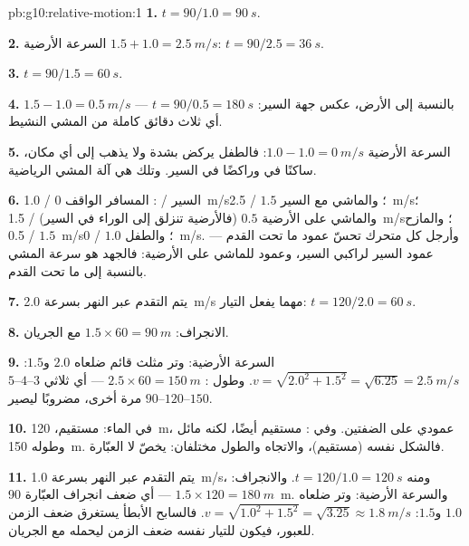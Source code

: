\begin{solution}{pb:g10:relative-motion:1}
\textbf{1.} $t = 90/1.0 = \qty{90}{s}$.

\textbf{2.} السرعة الأرضية $1.5 + 1.0 = \qty{2.5}{m/s}$:
$t = 90/2.5 = \qty{36}{s}$.

\textbf{3.} $t = 90/1.5 = \qty{60}{s}$.

\textbf{4.} $1.5 - 1.0 = \qty{0.5}{m/s}$ بالنسبة إلى الأرض،
عكس جهة السير: $t = 90/0.5 = \qty{180}{s}$ --- أي ثلاث
دقائق كاملة من المشي النشيط.

\textbf{5.} السرعة الأرضية $1.0 - 1.0 = \qty{0}{m/s}$: فالطفل يركض
بشدة ولا يذهب إلى أي مكان، ساكنًا في  وراكضًا في
 السير. وتلك هي آلة المشي الرياضية.

\textbf{6.}  السير / : المسافر الواقف $0$ /
\qty{1.0}{m/s}؛ والماشي مع السير $1.5$ / \qty{2.5}{m/s}؛ والماشي على
الأرضية $0.5$ (فالأرضية تنزلق إلى الوراء في  السير) /
\qty{1.5}{m/s}؛ والمازح $1.5$ / \qty{0.5}{m/s}؛ والطفل $1.0$ /
\qty{0}{m/s}. وأرجل كل متحرك تحسّ عمود  ما
تحت القدم --- عمود  السير لراكبي السير، وعمود
 للماشي على الأرضية: فالجهد هو سرعة المشي
بالنسبة إلى ما تحت القدم.

\textbf{7.} يتم التقدم عبر النهر بسرعة \qty{2.0}{m/s}
مهما يفعل التيار: $t = 120/2.0 = \qty{60}{s}$.

\textbf{8.} الانجراف: $1.5 \times 60 = \qty{90}{m}$ مع الجريان.

\textbf{9.} السرعة الأرضية: وتر مثلث قائم ضلعاه
$2.0$ و$1.5$: $v = \sqrt{2.0^2 + 1.5^2} = \sqrt{6.25}
= \qty{2.5}{m/s}$. وطول : $2.5 \times 60 = \qty{150}{m}$
--- أي ثلاثي $3$--$4$--$5$ مرة أخرى، مضروبًا ليصير $90$--$120$--$150$.

\textbf{10.} في  الماء: مستقيم، \qty{120}{m}، عمودي
على الضفتين. وفي : مستقيم أيضًا، لكنه مائل وطوله
\qty{150}{m}. فالشكل نفسه (مستقيم)، والاتجاه والطول مختلفان:
 يخصّ  لا العبّارة.

\textbf{11.} يتم التقدم عبر النهر بسرعة \qty{1.0}{m/s}، ومنه
$t = 120/1.0 = \qty{120}{s}$. والانجراف: $1.5 \times 120 = \qty{180}{m}$
--- أي ضعف انجراف العبّارة \qty{90}{m}. والسرعة الأرضية: وتر ضلعاه
$1.0$ و$1.5$: $v = \sqrt{1.0^2 + 1.5^2} = \sqrt{3.25}
\approx \qty{1.8}{m/s}$. فالسابح الأبطأ يستغرق ضعف الزمن
للعبور، فيكون للتيار نفسه ضعف الزمن ليحمله
مع الجريان.


\end{solution}
